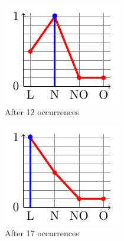 \begin{figure}
\begin{subfigure}[t]{.15\linewidth}
\includegraphics[width=\linewidth]{plot_tikz/speed12.pdf}
\caption{After 12 occurrences}
\label{fig:b}
\end{subfigure}
\begin{subfigure}[t]{.15\linewidth}
\includegraphics[width=\linewidth]{plot_tikz/speed17.pdf}
\caption{After 17 occurrences}
\label{fig:c}
\end{subfigure}
\begin{subfigure}[t]{.15\linewidth}

\end{subfigure}
\end{figure}
